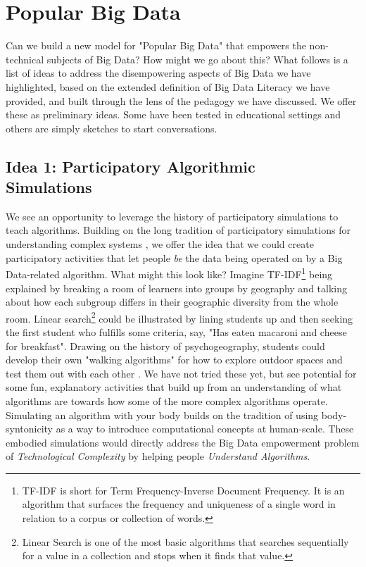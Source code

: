 \documentclass{sig-alternate}
\begin{document}
\section{Popular Big Data}

Can we build a new model for "Popular Big Data" that empowers the non-technical subjects of Big Data? How might we go about this? What follows is a list of ideas to address the disempowering aspects of Big Data we have highlighted, based on the extended definition of Big Data Literacy we have provided, and built through the lens of the pedagogy we have discussed.  We offer these as preliminary ideas. Some have been tested in educational settings and others are simply sketches to start conversations.

\subsection{Idea 1: Participatory Algorithmic \\Simulations
}
We see an opportunity to leverage the history of participatory simulations to teach algorithms.  Building on the long tradition of participatory simulations for understanding complex systems \cite{colella_participatory_2000}, we offer the idea that we could create participatory activities that let people \textit{be} the data being operated on by a Big Data-related algorithm.  What might this look like? Imagine TF-IDF\footnote{TF-IDF is short for Term Frequency-Inverse Document Frequency. It is an algorithm that surfaces the frequency and uniqueness of a single word in relation to a corpus or collection of words.} being explained by breaking a room of learners into groups by geography and talking about how each subgroup differs in their geographic diversity from the whole room. Linear search\footnote{Linear Search is one of the most basic algorithms that searches sequentially for a value in a collection and stops when it finds that value.
} could be illustrated by lining students up and then seeking the first student who fulfills some criteria, say, "Has eaten macaroni and cheese for breakfast". Drawing on the history of psychogeography, students could develop their own "walking algorithms" for how to explore outdoor spaces and test them out with each other \cite{hart_new_2004}. We have not tried these yet, but see potential for some fun, explanatory activities that build up from an understanding of what algorithms are towards how some of the more complex algorithms operate. Simulating an algorithm with your body builds on the tradition of using body-syntonicity as a way to introduce computational concepts \cite{papert_mindstorms_1980} at human-scale. These embodied simulations would directly address the Big Data empowerment problem of \textit{Technological Complexity} by helping people \textit{Understand Algorithms}.
\end{document}
